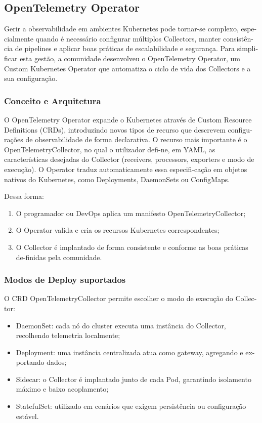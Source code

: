 \subsection{OpenTelemetry Operator}

Gerir a observabilidade em ambientes Kubernetes pode tornar-se complexo, espe-cialmente quando é necessário configurar múltiplos Collectors, manter consistên-cia de pipelines e aplicar boas práticas de escalabilidade e segurança. Para simpli-ficar esta gestão, a comunidade desenvolveu o OpenTelemetry Operator, um Custom Kubernetes Operator que automatiza o ciclo de vida dos Collectors e a sua configuração.

\subsubsection{Conceito e Arquitetura}

O OpenTelemetry Operator expande o Kubernetes através de Custom Resource Definitions (CRDs), introduzindo novos tipos de recurso que descrevem configu-rações de observabilidade de forma declarativa.
O recurso mais importante é o OpenTelemetryCollector, no qual o utilizador defi-ne, em YAML, as características desejadas do Collector (receivers, processors, exporters e modo de execução). O Operator traduz automaticamente essa especifi-cação em objetos nativos do Kubernetes, como Deployments, DaemonSets ou ConfigMaps.

Dessa forma:

\begin{enumerate}
    \item O programador ou DevOps aplica um manifesto OpenTelemetryCollector;
    \item O Operator valida e cria os recursos Kubernetes correspondentes;
    \item O Collector é implantado de forma consistente e conforme as boas práticas de-finidas pela comunidade.
\end{enumerate}

\subsubsection{Modos de Deploy suportados}

O CRD OpenTelemetryCollector permite escolher o modo de execução do Collec-tor:

\begin{itemize}
    \item DaemonSet: cada nó do cluster executa uma instância do Collector, recolhendo telemetria localmente;
    \item Deployment: uma instância centralizada atua como gateway, agregando e ex-portando dados;
    \item Sidecar: o Collector é implantado junto de cada Pod, garantindo isolamento máximo e baixo acoplamento;
    \item StatefulSet: utilizado em cenários que exigem persistência ou configuração estável.
\end{itemize}

